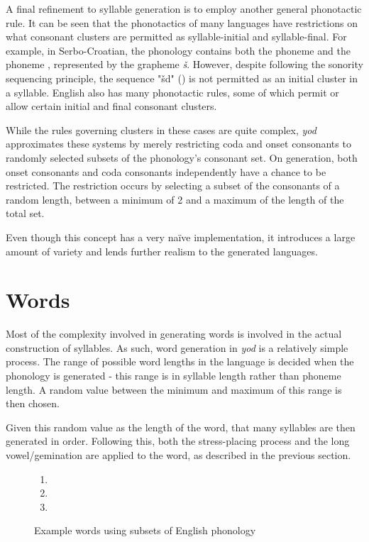 \documentclass{report}
\begin{document}
	A final refinement to syllable generation is to employ another general phonotactic rule. It can be seen that the phonotactics of many languages have restrictions on what consonant clusters are permitted as syllable-initial and syllable-final. For example, in Serbo-Croatian, the phonology contains both the phoneme  and the phoneme , represented by the grapheme \textit{\v{s}}. However, despite following the sonority sequencing principle, the sequence "\v{s}d" () is not permitted as an initial cluster in a syllable\cite{uzelac1971phonological}. English also has many phonotactic rules, some of which permit or allow certain initial and final consonant clusters\cite{chomsky1968sound}.
	
	While the rules governing clusters in these cases are quite complex, \textit{yod} approximates these systems by merely restricting coda and onset consonants to randomly selected subsets of the phonology's consonant set. On generation, both onset consonants and coda consonants independently have a chance to be restricted. The restriction occurs by selecting a subset of the consonants of a random length, between a minimum of 2 and a maximum of the length of the total set.
	
	Even though this concept has a very na\"{i}ve implementation, it introduces a large amount of variety and lends further realism to the generated languages.
	
	\section{Words}
	
	Most of the complexity involved in generating words is involved in the actual construction of syllables. As such, word generation in \textit{yod} is a relatively simple process. The range of possible word lengths in the language is decided when the phonology is generated - this range is in syllable length rather than phoneme length. A random value between the minimum and maximum of this range is then chosen.
	
	Given this random value as the length of the word, that many syllables are then generated in order. Following this, both the stress-placing process and the long vowel/gemination are applied to the word, as described in the previous section. 
	
	\begin{figure}
		\caption{Example words using subsets of English phonology}
		\label{example words english}
		\begin{tcolorbox}
			\begin{enumerate}
				\item {}
				\item {}
				\item {}
			\end{enumerate}
		\end{tcolorbox}
	\end{figure}
\end{document}
